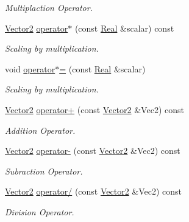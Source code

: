 \begin{DoxyCompactItemize}
\begin{DoxyCompactList}\small\item\em Multiplaction Operator. \item\end{DoxyCompactList}\item 
\hyperlink{classphys_1_1Vector2}{Vector2} \hyperlink{classphys_1_1Vector2_a59fa4aaadcccd04bf6de8fcd84b31c6d}{operator$\ast$} (const \hyperlink{namespacephys_af7eb897198d265b8e868f45240230d5f}{Real} \&scalar) const 
\begin{DoxyCompactList}\small\item\em Scaling by multiplication. \item\end{DoxyCompactList}\item 
void \hyperlink{classphys_1_1Vector2_a0b1555274551eb9bdea20d762c446e99}{operator$\ast$=} (const \hyperlink{namespacephys_af7eb897198d265b8e868f45240230d5f}{Real} \&scalar)
\begin{DoxyCompactList}\small\item\em Scaling by multiplication. \item\end{DoxyCompactList}\item 
\hyperlink{classphys_1_1Vector2}{Vector2} \hyperlink{classphys_1_1Vector2_a62102e9d75364c6be43723867cec3df8}{operator+} (const \hyperlink{classphys_1_1Vector2}{Vector2} \&Vec2) const 
\begin{DoxyCompactList}\small\item\em Addition Operator. \item\end{DoxyCompactList}\item 
\hyperlink{classphys_1_1Vector2}{Vector2} \hyperlink{classphys_1_1Vector2_a0aef47f873ef5a78707dd850d7d59504}{operator-\/} (const \hyperlink{classphys_1_1Vector2}{Vector2} \&Vec2) const 
\begin{DoxyCompactList}\small\item\em Subraction Operator. \item\end{DoxyCompactList}\item 
\hyperlink{classphys_1_1Vector2}{Vector2} \hyperlink{classphys_1_1Vector2_a3e4afe212ce1c739942aa8385c8f71e9}{operator/} (const \hyperlink{classphys_1_1Vector2}{Vector2} \&Vec2) const 
\begin{DoxyCompactList}\small\item\em Division Operator. \item\end{DoxyCompactList}\item 

\end{DoxyCompactItemize}
